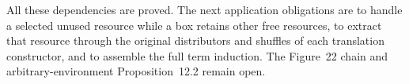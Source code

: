 All these dependencies are proved. The next application obligations are to
handle a selected unused resource while a box retains other free resources,
to extract that resource through the original distributors and shuffles of
each translation constructor, and to assemble the full term induction.
The Figure~22 chain and arbitrary-environment Proposition~12.2 remain open.
